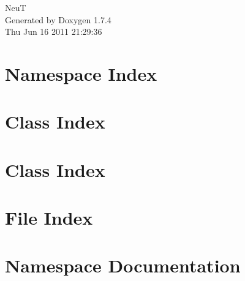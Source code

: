 \documentclass[a4paper]{book}
\begin{document}
\hypersetup{pageanchor=false}
\begin{titlepage}
\vspace*{7cm}
\begin{center}
{\Large NeuT }\\
\vspace*{1cm}
{\large Generated by Doxygen 1.7.4}\\
\vspace*{0.5cm}
{\small Thu Jun 16 2011 21:29:36}\\
\end{center}
\end{titlepage}
\clearemptydoublepage
{}
\tableofcontents
\clearemptydoublepage
{}
\hypersetup{pageanchor=true}
\chapter{Namespace Index}

\chapter{Class Index}

\chapter{Class Index}

\chapter{File Index}

\chapter{Namespace Documentation}

\end{document}
